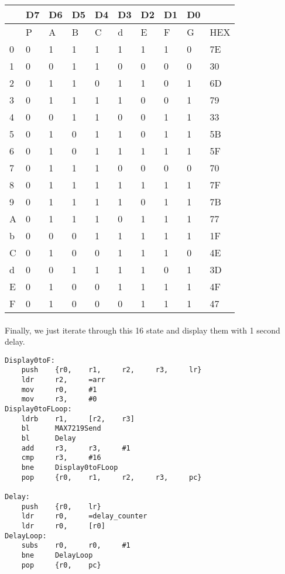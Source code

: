\begin{table}[h]
\centering
\begin{tabular}{|l|l|l|l|l|l|l|l|l|l|}
\hline
  & D7 & D6 & D5 & D4 & D3 & D2 & D1 & D0 &     \\ \hline
  & P  & A  & B  & C  & d  & E  & F  & G  & HEX \\ \hline
0 & 0  & 1  & 1  & 1  & 1  & 1  & 1  & 0  & 7E  \\ \hline
1 & 0  & 0  & 1  & 1  & 0  & 0  & 0  & 0  & 30  \\ \hline
2 & 0  & 1  & 1  & 0  & 1  & 1  & 0  & 1  & 6D  \\ \hline
3 & 0  & 1  & 1  & 1  & 1  & 0  & 0  & 1  & 79  \\ \hline
4 & 0  & 0  & 1  & 1  & 0  & 0  & 1  & 1  & 33  \\ \hline
5 & 0  & 1  & 0  & 1  & 1  & 0  & 1  & 1  & 5B  \\ \hline
6 & 0  & 1  & 0  & 1  & 1  & 1  & 1  & 1  & 5F  \\ \hline
7 & 0  & 1  & 1  & 1  & 0  & 0  & 0  & 0  & 70  \\ \hline
8 & 0  & 1  & 1  & 1  & 1  & 1  & 1  & 1  & 7F  \\ \hline
9 & 0  & 1  & 1  & 1  & 1  & 0  & 1  & 1  & 7B  \\ \hline
A & 0  & 1  & 1  & 1  & 0  & 1  & 1  & 1  & 77  \\ \hline
b & 0  & 0  & 0  & 1  & 1  & 1  & 1  & 1  & 1F  \\ \hline
C & 0  & 1  & 0  & 0  & 1  & 1  & 1  & 0  & 4E  \\ \hline
d & 0  & 0  & 1  & 1  & 1  & 1  & 0  & 1  & 3D  \\ \hline
E & 0  & 1  & 0  & 0  & 1  & 1  & 1  & 1  & 4F  \\ \hline
F & 0  & 1  & 0  & 0  & 0  & 1  & 1  & 1  & 47  \\ \hline
\end{tabular}
\end{table}
\paragraph{}
Finally, we just iterate through this 16 state and display them with 1 second delay.
\begin{lstlisting}
Display0toF:
    push    {r0,    r1,     r2,     r3,     lr}
    ldr     r2,     =arr
    mov     r0,     #1
    mov     r3,     #0
Display0toFLoop:
    ldrb    r1,     [r2,    r3]
    bl      MAX7219Send
    bl      Delay
    add     r3,     r3,     #1
    cmp     r3,     #16
    bne     Display0toFLoop
    pop     {r0,    r1,     r2,     r3,     pc}

Delay:
    push    {r0,    lr}
    ldr     r0,     =delay_counter
    ldr     r0,     [r0]
DelayLoop:
    subs    r0,     r0,     #1
    bne     DelayLoop
    pop     {r0,    pc}
\end{lstlisting}
